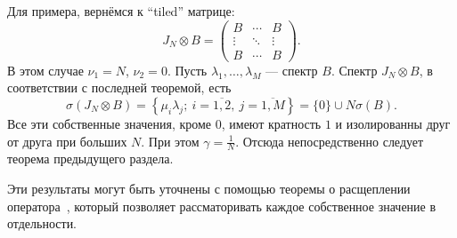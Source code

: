Для примера, вернёмся к ``tiled'' матрице:
\[
    J_N{\otimes}B =
    \begin{pmatrix}
        B & \cdots & B \\
        \vdots & \ddots & \vdots \\
        B & \cdots & B
    \end{pmatrix}.
\]
В этом случае
    \( \nu_1=N \),
    \( \nu_2=0 \).
Пусть \( \lambda_1,\ldots,\lambda_M \)
    --- спектр \( B \).
Спектр \( J_N{\otimes}B \), в соответствии с последней теоремой, есть
    \[
        \sigma(J_N{\otimes}B) = \left\{ \mu_i\lambda_j;\ i{=}\overline{1,2},\ j{=}\overline{1,M}\right\} = \{0\}\cup N\sigma(B).
    \]
Все эти собственные значения, кроме \( 0 \),
    имеют кратность \( 1 \)
    и изолированны друг от друга при больших \( N \).
При этом \( \gamma=\frac1N \).
Отсюда непосредственно следует теорема предыдущего раздела.

Эти результаты могут быть уточнены с помощью теоремы о расщеплении оператора~\cite{baskakov1987theorem},
    который позволяет рассматоривать каждое собственное значение в отдельности.
    
